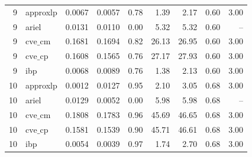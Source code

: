 \documentclass{article}
\begin{document}
\begin{table}[ht]
\begin{tabular}{rlrrrrrrr}
 \hline
 9 & approxlp & 0.0067 & 0.0057 & 0.78 & 1.39 & 2.17 & 0.60 & 3.00 \\
 9 & ariel & 0.0131 & 0.0110 & 0.00 & 5.32 & 5.32 & 0.60 & -- \\
 9 & $\text{cve\_cm}$ & 0.1681 & 0.1694 & 0.82 & 26.13 & 26.95 & 0.60 & 3.00 \\
 9 & $\text{cve\_cp}$ & 0.1608 & 0.1565 & 0.76 & 27.17 & 27.93 & 0.60 & 3.00 \\
 9 & ibp & 0.0068 & 0.0089 & 0.76 & 1.38 & 2.13 & 0.60 & 3.00 \\
 \hline
 10 & approxlp & 0.0012 & 0.0127 & 0.95 & 2.10 & 3.05 & 0.68 & 3.00 \\
 10 & ariel & 0.0129 & 0.0052 & 0.00 & 5.98 & 5.98 & 0.68 & -- \\
 10 & $\text{cve\_cm}$ & 0.1808 & 0.1783 & 0.96 & 45.69 & 46.65 & 0.68 & 3.00 \\
 10 & $\text{cve\_cp}$ & 0.1581 & 0.1539 & 0.90 & 45.71 & 46.61 & 0.68 & 3.00 \\
 10 & ibp & 0.0054 & 0.0039 & 0.97 & 1.74 & 2.70 & 0.68 & 3.00 \\
\bottomrule
\end{tabular}
\end{table}
\end{document}
